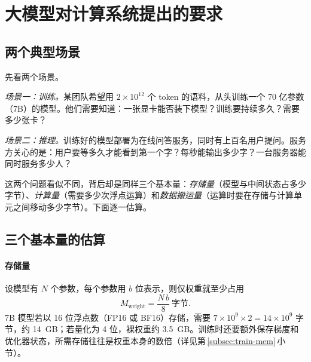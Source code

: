 \section{大模型对计算系统提出的要求}
\label{sec:req}

\begin{guide}
\end{guide}

\subsection{两个典型场景}

先看两个场景。

\emph{场景一：训练。}某团队希望用 $2\times10^{12}$ 个 token 的语料，从头训练一个 70 亿参数（7B）的模型。他们需要知道：一张显卡能否装下模型？训练要持续多久？需要多少张卡？

\emph{场景二：推理。}训练好的模型部署为在线问答服务，同时有上百名用户提问。服务方关心的是：用户要等多久才能看到第一个字？每秒能输出多少字？一台服务器能同时服务多少人？

这两个问题看似不同，背后却是同样三个基本量：\emph{存储量}（模型与中间状态占多少字节）、\emph{计算量}（需要多少次浮点运算）和\emph{数据搬运量}（运算时要在存储与计算单元之间移动多少字节）。下面逐一估算。

\subsection{三个基本量的估算}
\label{subsec:three-quantities}

\paragraph{存储量} 设模型有 $N$ 个参数，每个参数用 $b$ 位表示，则仅权重就至少占用
\begin{equation}
  M_{\mathrm{weight}} = \frac{N\,b}{8}\ \text{字节}.
  \label{eq:weight-mem}
\end{equation}
7B 模型若以 16 位浮点数（FP16 或 BF16）存储，需要 $7\times10^{9}\times 2 = 14\times10^{9}$ 字节，约 \SI{14}{GB}；若量化为 4 位，裸权重约 \SI{3.5}{GB}。训练时还要额外保存梯度和优化器状态，所需存储往往是权重本身的数倍（详见第\,\ref{subsec:train-mem}\,小节）。


